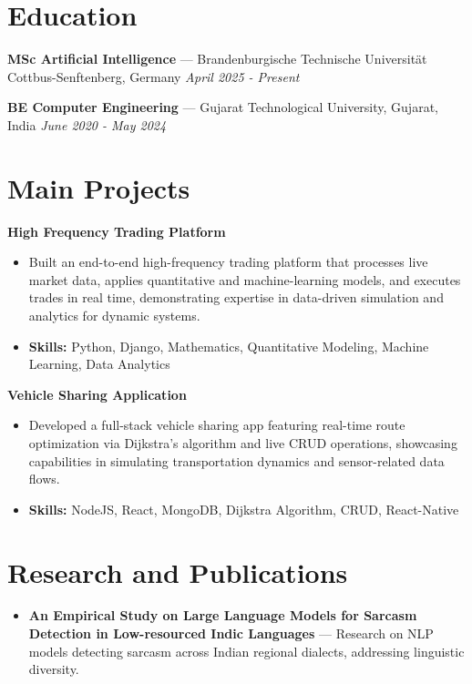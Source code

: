 \documentclass[a4paper,10pt]{article}
\begin{document}
\section*{Education}
\textbf{MSc Artificial Intelligence} — Brandenburgische Technische Universität Cottbus-Senftenberg, Germany \hfill \textit{April 2025 - Present}\par
\vspace{1.5pt}
\textbf{BE Computer Engineering} — Gujarat Technological University, Gujarat, India \hfill \textit{June 2020 - May 2024}\par

\section*{Main Projects}
\textbf{High Frequency Trading Platform}\par
\vspace{1pt}
\begin{itemize}
  \item Built an end-to-end high-frequency trading platform that processes live market data, applies quantitative and machine-learning models, and executes trades in real time, demonstrating expertise in data-driven simulation and analytics for dynamic systems.
  \item \textbf{Skills:} Python, Django, Mathematics, Quantitative Modeling, Machine Learning, Data Analytics
\end{itemize}
\vspace{3pt}
\textbf{Vehicle Sharing Application}\par
\vspace{1pt}
\begin{itemize}
  \item Developed a full-stack vehicle sharing app featuring real-time route optimization via Dijkstra's algorithm and live CRUD operations, showcasing capabilities in simulating transportation dynamics and sensor-related data flows.
  \item \textbf{Skills:} NodeJS, React, MongoDB, Dijkstra Algorithm, CRUD, React-Native
\end{itemize}

\section*{Research and Publications}
\begin{itemize}
\item \textbf{An Empirical Study on Large Language Models for Sarcasm Detection in Low-resourced Indic Languages} — Research on NLP models detecting sarcasm across Indian regional dialects, addressing linguistic diversity.
\end{itemize}
\end{document}

